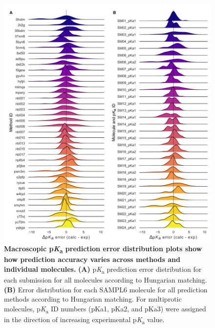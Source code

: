 \documentclass[9pt,lineno,final]{elife}
\newcommand{\pKa}{p\textit{K}\textsubscript{a}}
\begin{document}
\begin{figure}
\centering
\includegraphics[width=0.8\linewidth]{figures/typeIII-error-distribution.pdf}
\caption{{\bf Macroscopic \pKa{} prediction error distribution plots show how prediction accuracy varies across methods and individual molecules.}
{\bf(A)} \pKa{} prediction error distribution for each submission for all molecules according to Hungarian matching. {\bf(B)} Error distribution for each SAMPL6 molecule for all prediction methods according to Hungarian matching. For multiprotic molecules, \pKa{} ID numbers (pKa1, pKa2, and pKa3) were assigned in the direction of increasing experimental \pKa{} value. 
}
\label{fig:typeIII-error-distribution}
\end{figure}
\end{document}
